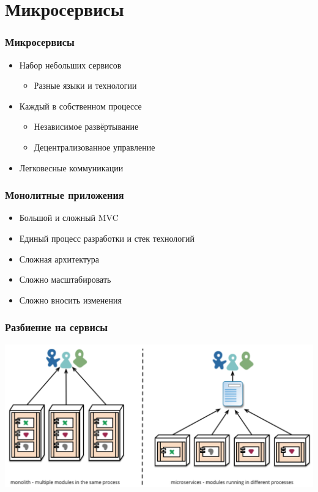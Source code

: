 \documentclass[xetex,mathserif,serif]{beamer}
\begin{document}
	\section{Микросервисы}

	\begin{frame}
		\frametitle{Микросервисы}
		\begin{itemize}
			\item Набор небольших сервисов
			\begin{itemize}
				\item Разные языки и технологии
			\end{itemize}
			\item Каждый в собственном процессе
			\begin{itemize}
				\item Независимое развёртывание
				\item Децентрализованное управление
			\end{itemize}
			\item Легковесные коммуникации
		\end{itemize}
	\end{frame}

	\begin{frame}
		\frametitle{Монолитные приложения}
		\begin{itemize}
			\item Большой и сложный MVC
			\item Единый процесс разработки и стек технологий
			\item Сложная архитектура
			\item Сложно масштабировать
			\item Сложно вносить изменения
		\end{itemize}
	\end{frame}

	\begin{frame}
		\frametitle{Разбиение на сервисы}
		\begin{center}
			\includegraphics[width=\textwidth]{microservices.png}
		\end{center}
	\end{frame}
\end{document}

